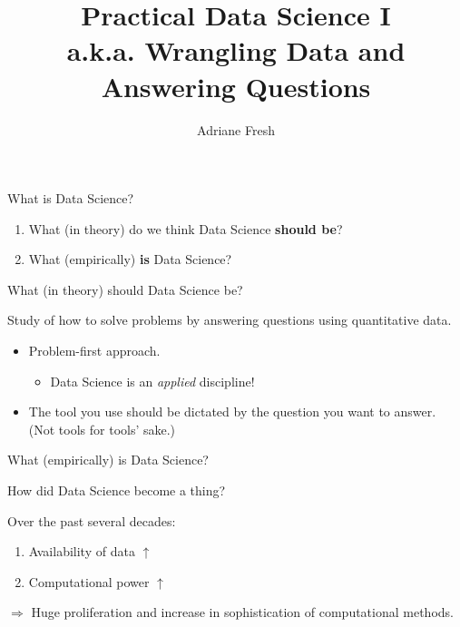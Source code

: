 \documentclass[11pt]{beamer}
\title{Practical Data Science I \\ a.k.a. Wrangling Data and Answering Questions}
\author{\small Adriane Fresh}
\date{\vspace*{.3in} \date}
\begin{document}
\begin{frame}
\maketitle
\end{frame}


\begin{frame}[c]{What is Data Science?}
\begin{enumerate}
	\pause \item What (\alert{in theory}) do we think Data Science \textbf{should be}?
	\pause \item What (\alert{empirically}) \textbf{is} Data Science?
\end{enumerate}
\end{frame}


\begin{frame}[c]{What (in theory) should Data Science be?}

\pause Study of how to \alert{solve problems} \pause by \alert{answering questions} \pause using \alert{quantitative data.}

\pause
\begin{itemize}
	\item Problem-first approach.
	\begin{itemize}
		\pause \item Data Science is an \emph{applied} discipline!
	\end{itemize}
	\pause \item The tool you use should be dictated by the question you want to answer.  (Not tools for tools' sake.)
\end{itemize}

\end{frame}


\begin{frame}[c]{What (empirically) is Data Science?}

\end{frame}

\begin{frame}[c]{How did Data Science become a thing?}

Over the past \alert{several decades}:
\begin{enumerate}
	\item Availability of data $\uparrow$
	\item Computational power $\uparrow$
\end{enumerate}
\pause
$\Rightarrow$ Huge proliferation and increase in sophistication of computational methods.
\end{frame}
\end{document}

